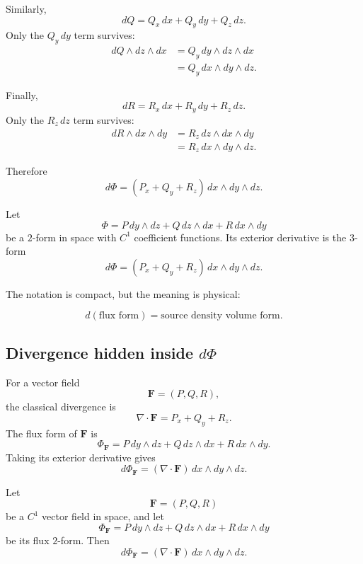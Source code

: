 Similarly,
\[
    dQ=Q_x\,dx+Q_y\,dy+Q_z\,dz.
\]
Only the \(Q_y\,dy\) term survives:
\[
\begin{aligned}
    dQ\wedge dz\wedge dx
    &=
    Q_y\,dy\wedge dz\wedge dx\\
    &=
    Q_y\,dx\wedge dy\wedge dz.
\end{aligned}
\]

Finally,
\[
    dR=R_x\,dx+R_y\,dy+R_z\,dz.
\]
Only the \(R_z\,dz\) term survives:
\[
\begin{aligned}
    dR\wedge dx\wedge dy
    &=
    R_z\,dz\wedge dx\wedge dy\\
    &=
    R_z\,dx\wedge dy\wedge dz.
\end{aligned}
\]

Therefore
\[
\boxed{
    d\Phi
    =
    (P_x+Q_y+R_z)\,dx\wedge dy\wedge dz.
}
\]

\begin{definition}
Let
\[
    \Phi=P\,dy\wedge dz+Q\,dz\wedge dx+R\,dx\wedge dy
\]
be a \(2\)-form in space with \(C^1\) coefficient functions.  Its exterior derivative is
the \(3\)-form
\[
\boxed{
    d\Phi
    =
    (P_x+Q_y+R_z)\,dx\wedge dy\wedge dz.
}
\]
\end{definition}

The notation is compact, but the meaning is physical:

\[
\boxed{
    d(\text{flux form})=\text{source density volume form}.
}
\]

\subsection{Divergence hidden inside \texorpdfstring{\(d\Phi\)}{d Phi}}

For a vector field
\[
    \mathbf F=(P,Q,R),
\]
the classical divergence is
\[
\boxed{
    \nabla\cdot\mathbf F=P_x+Q_y+R_z.
}
\]
The flux form of \(\mathbf F\) is
\[
    \Phi_{\mathbf F}
    =
    P\,dy\wedge dz
    +
    Q\,dz\wedge dx
    +
    R\,dx\wedge dy.
\]
Taking its exterior derivative gives
\[
\boxed{
    d\Phi_{\mathbf F}
    =
    (\nabla\cdot\mathbf F)\,dx\wedge dy\wedge dz.
}
\]

\begin{theorem}
Let
\[
    \mathbf F=(P,Q,R)
\]
be a \(C^1\) vector field in space, and let
\[
    \Phi_{\mathbf F}
    =
    P\,dy\wedge dz
    +
    Q\,dz\wedge dx
    +
    R\,dx\wedge dy
\]
be its flux \(2\)-form.  Then
\[
\boxed{
    d\Phi_{\mathbf F}
    =
    (\nabla\cdot\mathbf F)\,dx\wedge dy\wedge dz.
}
\]
\end{theorem}

